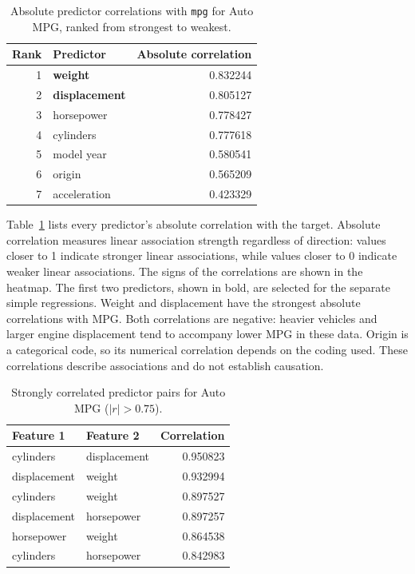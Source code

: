 \documentclass{article}
\begin{document}
\begin{table}[H]
\centering
\small
\begin{tabular}{rlr}
\toprule
Rank & Predictor & Absolute correlation \\
\midrule
1 & \textbf{weight} & 0.832244 \\
2 & \textbf{displacement} & 0.805127 \\
3 & horsepower & 0.778427 \\
4 & cylinders & 0.777618 \\
5 & model year & 0.580541 \\
6 & origin & 0.565209 \\
7 & acceleration & 0.423329 \\
\bottomrule
\end{tabular}
\caption{Absolute predictor correlations with \texttt{mpg} for Auto MPG, ranked from strongest to weakest.}
\label{tab:auto_mpg_target_corr}
\end{table}

Table~\ref{tab:auto_mpg_target_corr} lists every predictor's absolute correlation with the target. Absolute correlation measures linear association strength regardless of direction: values closer to 1 indicate stronger linear associations, while values closer to 0 indicate weaker linear associations. The signs of the correlations are shown in the heatmap. The first two predictors, shown in bold, are selected for the separate simple regressions. Weight and displacement have the strongest absolute correlations with MPG. Both correlations are negative: heavier vehicles and larger engine displacement tend to accompany lower MPG in these data. Origin is a categorical code, so its numerical correlation depends on the coding used. These correlations describe associations and do not establish causation.

\begin{table}[H]
\centering
\small
\begin{tabular}{llr}
\toprule
Feature 1 & Feature 2 & Correlation \\
\midrule
cylinders & displacement & 0.950823 \\
displacement & weight & 0.932994 \\
cylinders & weight & 0.897527 \\
displacement & horsepower & 0.897257 \\
horsepower & weight & 0.864538 \\
cylinders & horsepower & 0.842983 \\
\bottomrule
\end{tabular}
\caption{Strongly correlated predictor pairs for Auto MPG ($|r| > 0.75$).}
\label{tab:auto_mpg_predictor_pairs}
\end{table}
\end{document}
